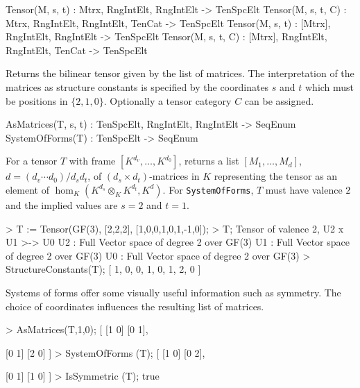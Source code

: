 \begin{intrinsics}
Tensor(M, s, t) : Mtrx, RngIntElt, RngIntElt -> TenSpcElt 
Tensor(M, s, t, C) : Mtrx, RngIntElt, RngIntElt, TenCat -> TenSpcElt
Tensor(M, s, t) : [Mtrx], RngIntElt, RngIntElt -> TenSpcElt 
Tensor(M, s, t, C) : [Mtrx], RngIntElt, RngIntElt, TenCat -> TenSpcElt
\end{intrinsics}

Returns the bilinear tensor given by the list of matrices.  The interpretation
of the matrices as structure constants is specified by the coordinates $s$ and $t$
which must be positions in $\{2,1,0\}$.  Optionally a tensor category $C$ can be assigned.

\begin{intrinsics}
AsMatrices(T, s, t) : TenSpcElt, RngIntElt, RngIntElt -> SeqEnum
SystemOfForms(T) : TenSpcElt -> SeqEnum
\end{intrinsics}

For a tensor $T$ with frame $[K^{d_v},\dots,K^{d_0}]$, 
returns a list $[M_1,\dots,M_d]$, $d=(d_v\cdots d_0)/d_s d_t$, 
of $(d_s\times d_t)$-matrices in $K$ representing the tensor
as an element of $\hom_K(K^{d_s}\otimes_K K^{d_t},K^d)$.
For {\tt SystemOfForms}, $T$ must have valence $2$ and the implied values
are $s=2$ and $t=1$.

\begin{example}
\begin{code}
> T := Tensor(GF(3), [2,2,2], [1,0,0,1,0,1,-1,0]);
> T;
Tensor of valence 2, U2 x U1 >-> U0
U2 : Full Vector space of degree 2 over GF(3)
U1 : Full Vector space of degree 2 over GF(3)
U0 : Full Vector space of degree 2 over GF(3)
> StructureConstants(T);
[ 1, 0, 0, 1, 0, 1, 2, 0 ]
\end{code}

Systems of forms offer some visually useful information such as
symmetry.
The choice of coordinates influences the resulting list of matrices.

\begin{code}
> AsMatrices(T,1,0);
[
    [1 0]
    [0 1],

    [0 1]
    [2 0]
]
> SystemOfForms (T);
[
    [1 0]
    [0 2],

    [0 1]
    [1 0]
]
> IsSymmetric (T);
true
\end{code}
\end{example}

